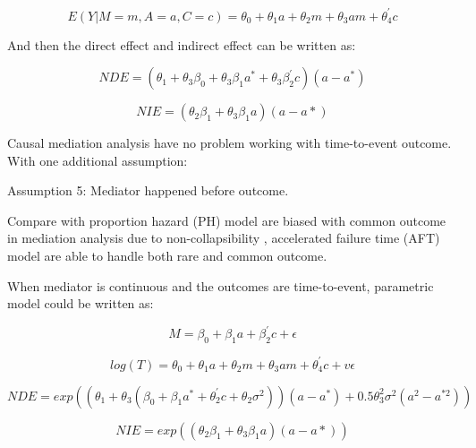 \documentclass{article}
\begin{document}
\begin{equation}
E (Y |M = m,A = a,C = c) = \theta_0+\theta_1 a+ \theta_2 m + \theta_3 a m + \theta_4^{'} c
\end{equation}

And then the direct effect and indirect effect can be written as:

\begin{equation}
NDE = (\theta_1 + \theta_3 \beta_0 + \theta_3 \beta_1 a^* + \theta_3 \beta_2^{'} c)(a - a^*)
\end{equation}

\begin{equation}
NIE = (\theta_2 \beta_1 + \theta_3 \beta_1 a)(a - a*)
\end{equation}


Causal mediation analysis have no problem working with time-to-event outcome. With one additional assumption:\newline

Assumption 5:  Mediator happened before outcome.\newline

Compare with proportion hazard (PH) model are biased with common outcome in mediation analysis due to non-collapsibility , accelerated failure time (AFT) model are able to handle both rare and common outcome.

When mediator is continuous and the outcomes are time-to-event, parametric model could be written as:\


\begin{equation}
M =  \beta_0+\beta_1 a+ \beta_2^{'} c + \epsilon
\end{equation}



\begin{equation}
log(T) = \theta_0+\theta_1 a+ \theta_2 m + \theta_3 a m + \theta_4^{'} c + v \epsilon
\end{equation}



\begin{equation}
NDE = exp((\theta_1 + \theta_3 (\beta_0 + \beta_1 a^* +  \theta_2^{'} c + \theta_2 \sigma^2))(a - a^*) + 0.5 \theta_3 ^2 \sigma^2 (a^2 - a^{*2}))
\end{equation}



\begin{equation}
NIE = exp((\theta_2 \beta_1 + \theta_3 \beta_1 a)(a - a*))
\end{equation}
\end{document}
